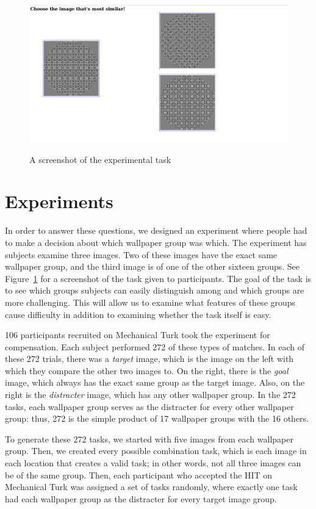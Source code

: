 \begin{figure}[!ht]
\centering
\includegraphics[width=0.9\columnwidth]{symper}
\label{screenshot}
\caption{A screenshot of the experimental task}
\end{figure}


\section{Experiments}
In order to answer these questions, we designed an experiment where people had to make a decision about which wallpaper group was which. The experiment has subjects examine three images. Two of these images have the exact same wallpaper group, and the third image is of one of the other sixteen groups. See Figure~\ref{screenshot} for a screenshot of the task given to participants. The goal of the task is to see which groups subjects can easily distinguish among and which groups are more challenging. This will allow us to examine what features of these groups cause difficulty in addition to examining whether the task itself is easy.

106 participants recruited on Mechanical Turk took the experiment for compensation. Each subject performed 272 of these types of matches. In each of these 272 trials, there was a \textit{target} image, which is the image on the left with which they compare the other two images to. On the right, there is the \textit{goal} image, which always has the exact same group as the target image. Also, on the right is the \textit{distracter} image, which has any other wallpaper group. In the 272 tasks, each wallpaper group serves as the distracter for every other wallpaper group: thus, 272 is the simple product of 17 wallpaper groups with the 16 others.

To generate these 272 tasks, we started with five images from each wallpaper group. Then, we created every possible combination task, which is each image in each location that creates a valid task; in other words, not all three images can be of the same group. Then, each participant who accepted the HIT on Mechanical Turk was assigned a set of tasks randomly, where exactly one task had each wallpaper group as the distracter for every target image group.

